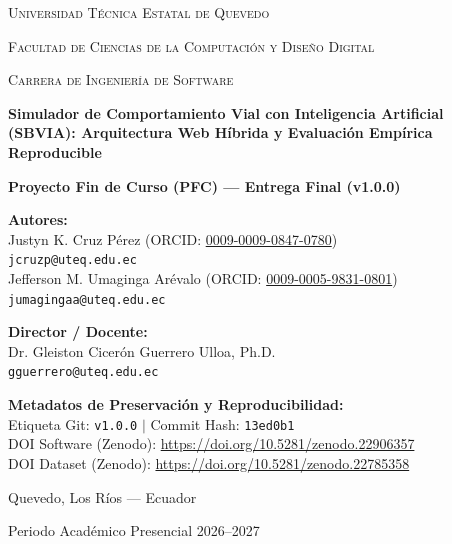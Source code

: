 \documentclass[11pt,a4paper]{report}
\begin{document}
\begin{titlepage}
    \centering
    {\scshape\LARGE Universidad Técnica Estatal de Quevedo \par}
    \vspace{0.5cm}
    {\scshape\Large Facultad de Ciencias de la Computación y Diseño Digital \par}
    {\scshape\large Carrera de Ingeniería de Software \par}
    \vspace{1.5cm}
    
    {\huge\bfseries Simulador de Comportamiento Vial con Inteligencia Artificial (SBVIA): Arquitectura Web Híbrida y Evaluación Empírica Reproducible \par}
    \vspace{1.5cm}
    
    {\Large\textbf{Proyecto Fin de Curso (PFC) --- Entrega Final (v1.0.0)} \par}
    \vspace{1.0cm}
    
    \textbf{Autores:} \\
    Justyn K. Cruz Pérez \quad (ORCID: \href{https://orcid.org/0009-0009-0847-0780}{0009-0009-0847-0780}) \\ \texttt{jcruzp@uteq.edu.ec} \\
    Jefferson M. Umaginga Arévalo \quad (ORCID: \href{https://orcid.org/0009-0005-9831-0801}{0009-0005-9831-0801}) \\ \texttt{jumagingaa@uteq.edu.ec} \\
    \vspace{0.8cm}
    
    \textbf{Director / Docente:} \\
    Dr. Gleiston Cicerón Guerrero Ulloa, Ph.D. \\
    \texttt{gguerrero@uteq.edu.ec} \\
    \vspace{1.0cm}
    
    \textbf{Metadatos de Preservación y Reproducibilidad:} \\
    Etiqueta Git: \texttt{v1.0.0} \quad $\vert$ \quad Commit Hash: \texttt{13ed0b1} \\
    DOI Software (Zenodo): \url{https://doi.org/10.5281/zenodo.22906357} \\
    DOI Dataset (Zenodo): \url{https://doi.org/10.5281/zenodo.22785358} \\
    \vfill
    
    {\large Quevedo, Los Ríos --- Ecuador \par}
    {\large Periodo Académico Presencial 2026--2027 \par}
\end{titlepage}
\end{document}
